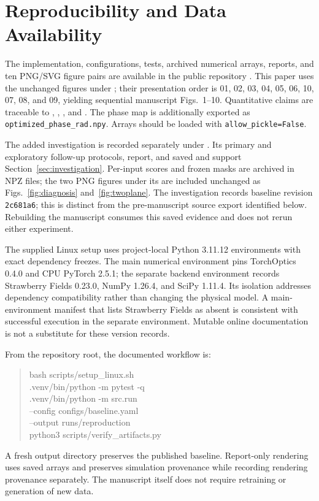 \documentclass[journal]{IEEEtran}
\begin{document}
\section{Reproducibility and Data Availability}
The implementation, configurations, tests, archived numerical arrays, reports, and ten PNG/SVG figure pairs are available in the public repository \cite{repository}. This paper uses the unchanged figures under ; their presentation order is 01, 02, 03, 04, 05, 06, 10, 07, 08, and 09, yielding sequential manuscript Figs.~1--10. Quantitative claims are traceable to , , , and . The phase map is additionally exported as \texttt{optimized\_phase\_rad.npy}. Arrays should be loaded with \texttt{allow\_pickle=False}.

The added investigation is recorded separately under . Its primary and exploratory follow-up protocols, report, and saved  and  support Section~\ref{sec:investigation}. Per-input scores and frozen masks are archived in NPZ files; the two PNG figures under its  are included unchanged as Figs.~\ref{fig:diagnosis} and~\ref{fig:twoplane}. The investigation records baseline revision \texttt{2c681a6}; this is distinct from the pre-manuscript source export identified below. Rebuilding the manuscript consumes this saved evidence and does not rerun either experiment.

The supplied Linux setup uses project-local Python 3.11.12 environments with exact dependency freezes. The main numerical environment pins TorchOptics 0.4.0 and CPU PyTorch 2.5.1; the separate backend environment records Strawberry Fields 0.23.0, NumPy 1.26.4, and SciPy 1.11.4. Its isolation addresses dependency compatibility rather than changing the physical model. A main-environment manifest that lists Strawberry Fields as absent is consistent with successful execution in the separate environment. Mutable online documentation is not a substitute for these version records.

From the repository root, the documented workflow is:
\begin{quote}\small\ttfamily
bash scripts/setup\_linux.sh\\
.venv/bin/python -m pytest -q\\
.venv/bin/python -m src.run \\
\hspace*{1em}--config configs/baseline.yaml \\
\hspace*{1em}--output runs/reproduction\\
python3 scripts/verify\_artifacts.py
\end{quote}
A fresh output directory preserves the published baseline. Report-only rendering uses saved arrays and preserves simulation provenance while recording rendering provenance separately. The manuscript itself does not require retraining or generation of new data.
\end{document}
